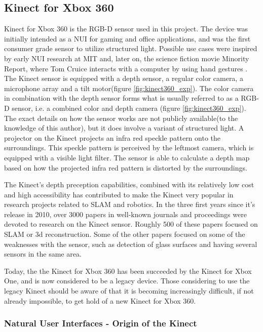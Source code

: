 \subsection{Kinect for Xbox 360}
\label{sec:kinect}
Kinect for Xbox 360 is the RGB-D sensor used in this project. The device  was initially intended as a \ac{NUI} for gaming and office applications, and was the first consumer grade sensor to utilize structured light. Possible use cases were inspired by early \ac{NUI} research at \ac{MIT} and, later on, the science fiction movie Minority Report, where Tom Cruice interacts with a computer by using hand gestures \cite{kinect_book}. The Kinect sensor is equipped with a depth sensor, a regular color camera, a microphone array and a tilt motor(figure \ref{fig:kinect360_exp}). The color camera in combination with the depth sensor forms what is usually referred to as a RGB-D sensor, i.e. a combined color and depth camera (figure \ref{fig:kinect360_exp}). The exact details on how the sensor works are not publicly available(to the knowledge of this author), but it does involve a variant of structured light. A projector on the Kinect projects an infra red speckle pattern onto the surroundings. This speckle pattern is perceived by the leftmost camera, which is equipped with a visible light filter. The sensor is able to calculate a depth map based on how the projected infra red pattern is distorted by the surroundings.

The Kinect's depth preception capabilities, combined with its relatively low cost and high accessibility has contributed to make the Kinect very popular in research projects related to \ac{SLAM} and robotics. In the three first years since it's release in 2010, over 3000 papers in well-known journals and proceedings were devoted to research on the Kinect sensor. Roughly 500 of these papers focused on \ac{SLAM} or 3d reconstruction\cite{Berger2013}. Some of the other papers focused on some of the weaknesses with the sensor, such as detection of glass surfaces and having several sensors in the same area. 


Today, the the Kinect for Xbox 360 has been succeeded by the Kinect for Xbox One, and is now considered to be a legacy device. Those considering to use the legacy Kinect should be aware of that it is becoming increasingly difficult, if not already impossible, to get hold of a new Kinect for Xbox 360. 

\subsubsection{Natural User Interfaces - Origin of the Kinect}

